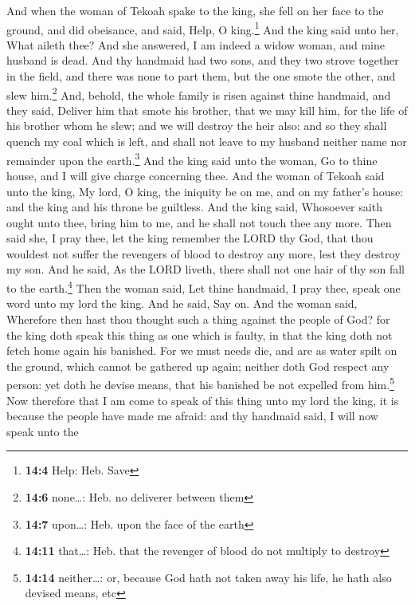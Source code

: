  And when the woman of Tekoah spake to the king, she fell
on her face to the ground, and did obeisance, and said, Help, O
king.\footnote{\textbf{14:4} Help: Heb. Save}  And the
king said unto her, What aileth thee? And she answered, I am indeed a
widow woman, and mine husband is dead.  And thy handmaid
had two sons, and they two strove together in the field, and there was
none to part them, but the one smote the other, and slew him.\footnote{\textbf{14:6}
  none\ldots: Heb. no deliverer between them}  And,
behold, the whole family is risen against thine handmaid, and they said,
Deliver him that smote his brother, that we may kill him, for the life
of his brother whom he slew; and we will destroy the heir also: and so
they shall quench my coal which is left, and shall not leave to my
husband neither name nor remainder upon the earth.\footnote{\textbf{14:7}
  upon\ldots: Heb. upon the face of the earth}  And the
king said unto the woman, Go to thine house, and I will give charge
concerning thee.  And the woman of Tekoah said unto the
king, My lord, O king, the iniquity be on me, and on my father's house:
and the king and his throne be guiltless.  And the king
said, Whosoever saith ought unto thee, bring him to me, and he shall not
touch thee any more.  Then said she, I pray thee, let the
king remember the LORD thy God, that thou wouldest not suffer the
revengers of blood to destroy any more, lest they destroy my son. And he
said, As the LORD liveth, there shall not one hair of thy son fall to
the earth.\footnote{\textbf{14:11} that\ldots: Heb. that the revenger of
  blood do not multiply to destroy}  Then the woman said,
Let thine handmaid, I pray thee, speak one word unto my lord the king.
And he said, Say on.  And the woman said, Wherefore then
hast thou thought such a thing against the people of God? for the king
doth speak this thing as one which is faulty, in that the king doth not
fetch home again his banished.  For we must needs die,
and are as water spilt on the ground, which cannot be gathered up again;
neither doth God respect any person: yet doth he devise means, that his
banished be not expelled from him.\footnote{\textbf{14:14}
  neither\ldots: or, because God hath not taken away his life, he hath
  also devised means, etc}  Now therefore that I am come
to speak of this thing unto my lord the king, it is because the people
have made me afraid: and thy handmaid said, I will now speak unto the
